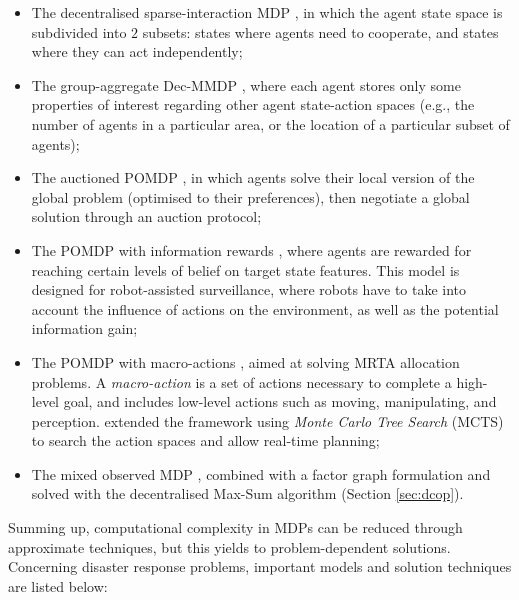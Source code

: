 \begin{itemize}
    \item The decentralised sparse-interaction MDP \cite{melo2011}, in which the agent
        state space is subdivided into $2$ subsets: states where agents need to cooperate,
        and states where they can act independently;
    \item The group-aggregate Dec-MMDP \cite{redding2012}, where each agent stores only
        some properties of interest regarding other agent state-action spaces (e.g., the
        number of agents in a particular area, or the location of a particular subset of
        agents);
    \item The auctioned POMDP \cite{capitan2013}, in which agents solve their local
        version of the global problem (optimised to their preferences), then negotiate a
        global solution through an auction protocol;
    \item The POMDP with information rewards \cite{spaan2015}, where agents are
        rewarded for reaching certain levels of belief on target state features. This
        model is designed for robot-assisted surveillance, where robots have to take into
        account the influence of actions on the environment, as well as the potential
        information gain;
    \item The POMDP with macro-actions \cite{amato2016}, aimed at solving MRTA
        allocation problems. A \emph{macro-action} is a set of actions necessary to
        complete a high-level goal, and includes low-level actions such as moving,
        manipulating, and perception. \cite{smith2019} extended the framework using
        \emph{Monte Carlo Tree Search} (MCTS) to search the action spaces and allow
        real-time planning;
    \item The mixed observed MDP \cite{chen2021}, combined with a factor graph formulation
        and solved with the decentralised Max-Sum algorithm (Section \ref{sec:dcop}).
\end{itemize}
Summing up, computational complexity in MDPs can be reduced through approximate
techniques, but this yields to problem-dependent solutions. Concerning disaster response
problems, important models and solution techniques are listed below:
